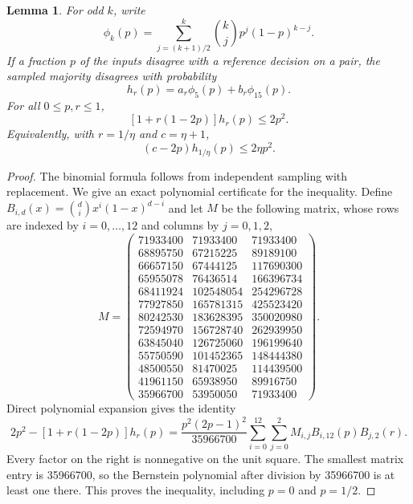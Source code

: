 \documentclass[11pt]{article}
\newtheorem{lemma}[theorem]{Lemma}
\begin{document}
\begin{lemma}\label{lem:improved-majority}
For odd $k$, write
\[
 \phi_k(p)=\sum_{j=(k+1)/2}^k\binom{k}{j}p^j(1-p)^{k-j}.
\]
If a fraction $p$ of the inputs disagree with a reference decision on
a pair, the sampled majority disagrees with probability
\[
 h_r(p)=a_r\phi_5(p)+b_r\phi_{15}(p).
\]
For all $0\le p,r\le1$,
\[
 {}[1+r(1-2p)]h_r(p)\le2p^2.
\]
Equivalently, with $r=1/\eta$ and $c=\eta+1$,
\[
 (c-2p)h_{1/\eta}(p)\le2\eta p^2.
\]
\end{lemma}
\begin{proof}
The binomial formula follows from independent sampling with replacement.
We give an exact polynomial certificate for the inequality. Define
$B_{i,d}(x)=\binom di x^i(1-x)^{d-i}$ and let $M$ be the following
matrix, whose rows are indexed by $i=0,\ldots,12$ and columns by
$j=0,1,2$,
\[
 M=\begin{pmatrix}
71933400&71933400&71933400\\
68895750&67215225&89189100\\
66657150&67444125&117690300\\
65955078&76436514&166396734\\
68411924&102548054&254296728\\
77927850&165781315&425523420\\
80242530&183628395&350020980\\
72594970&156728740&262939950\\
63845040&126725060&196199640\\
55750590&101452365&148444380\\
48500550&81470025&114439500\\
41961150&65938950&89916750\\
35966700&53950050&71933400
\end{pmatrix}.
\]
Direct polynomial expansion gives the identity
\[
 2p^2-[1+r(1-2p)]h_r(p)
 =\frac{p^2(2p-1)^2}{35966700}
       \sum_{i=0}^{12}\sum_{j=0}^2 M_{i,j}B_{i,12}(p)B_{j,2}(r).
\]
Every factor on the right is nonnegative on the unit square. The
smallest matrix entry is 35966700, so the Bernstein polynomial after
division by 35966700 is at least one there. This proves the inequality,
including $p=0$ and $p=1/2$.
\end{proof}
\end{document}
